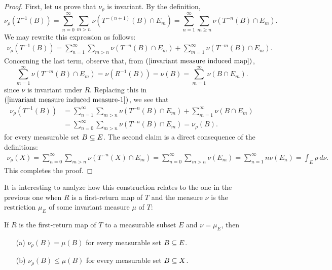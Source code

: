 \begin{proof}
First, let us prove that $\nu_\rho$ is invariant. By the definition,
\[\nu_\rho(T^{-1}(B))=\sum_{n=0}^{\infty}\sum_{m>n}\nu(T^{-(n+1)}(B)\cap E_m)=\sum_{n=1}^{\infty}\sum_{m\geq n}\nu(T^{-n}(B)\cap E_m).\]
We may rewrite this expression as follows:
\begin{align}\label{invariant measure induced measure-1}
\nu_\rho(T^{-1}(B))=\sum_{n=1}^{\infty}\sum_{m>n}\nu(T^{-n}(B)\cap E_m)+\sum_{m=1}^{\infty}\nu(T^{-m}(B)\cap E_m).
\end{align}
Concerning the last term, observe that, from $(\ref{invariant measure induced map})$,
\[\sum_{m=1}^{\infty}\nu(T^{-m}(B)\cap E_m)=\nu(R^{-1}(B))=\nu(B)=\sum_{m=1}^{\infty}\nu(B\cap E_m).\]
since $\nu$ is invariant under $R$. Replacing this in $(\ref{invariant measure induced measure-1})$, we see that
\begin{align*}
\nu_\rho(T^{-1}(B))&=\sum_{n=1}^{\infty}\sum_{m>n}\nu(T^{-n}(B)\cap E_m)+\sum_{m=1}^{\infty}\nu(B\cap E_m)\\
&=\sum_{n=0}^{\infty}\sum_{m>n}\nu(T^{-n}(B)\cap E_m)=\nu_\rho(B).
\end{align*}
for every measurable set $B\subseteq E$. The second claim is a direct consequence of the definitions:
\begin{align*}
\nu_\rho(X)=\sum_{n=0}^{\infty}\sum_{m>n}\nu(T^{-n}(X)\cap E_m)=\sum_{n=0}^{\infty}\sum_{m>n}\nu(E_m)=\sum_{n=1}^{\infty}n\nu(E_n)=\int_E\rho\,d\nu.
\end{align*}
This completes the proof.
\end{proof}
It is interesting to analyze how this construction relates to the one in the previous one when $R$ is a first-return map of $T$ and the measure $\nu$ is the restriction $\mu_E$ of some invariant measure $\mu$ of $T$:
\begin{corollary}\label{invariant measure first return map induced measure}
If $R$ is the first-return map of $T$ to a measurable subset $E$ and $\nu=\mu_E$, then
\begin{itemize}
\item[(a)] $\nu_\rho(B)=\mu(B)$ for every measurable set $B\subseteq E$.
\item[(b)] $\nu_\rho(B)\leq\mu(B)$ for every measurable set $B\subseteq X$.
\end{itemize}
\end{corollary}
